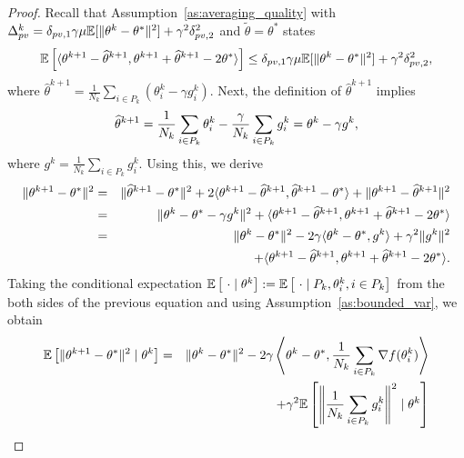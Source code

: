 \begin{proof}
Recall that Assumption~\ref{as:averaging_quality} with $\Delta_{pv}^k = \delta_{pv,1}\gamma\mu\mathbb{E}[\|\theta^k-\theta^*\|^2] + \gamma^2\delta_{pv,2}^2$ and $\widetilde{\theta} = \theta^*$ states
\begin{equation}
    \mathbb{E}\left[\langle\theta^{k+1} - \widehat{\theta}^{k+1}, \theta^{k+1}+\widehat{\theta}^{k+1} - 2\theta^*\rangle\right] \le \delta_{pv,1}\gamma\mu\mathbb{E}[\|\theta^k-\theta^*\|^2] + \gamma^2\delta_{pv,2}^2, \label{eq:key_lemma_cvx_tech_1}
\end{equation}
where $\widehat \theta^{k+1} = \frac{1}{N_{k}}\sum_{i\in P_{k}}(\theta_i^{k}-\gamma g_i^k)$. Next, the definition of $\widehat \theta^{k+1}$ implies
\begin{equation}
    \widehat \theta^{k+1} = \frac{1}{N_k}\sum\limits_{i\in P_{k}}\theta_i^{k} - \frac{\gamma}{N_k}\sum\limits_{i\in P_{k}} g_i^k = \theta^k - \gamma g^k,\notag
\end{equation}
where $g^k = \frac{1}{N_k}\sum_{i\in P_k}g_i^k$. Using this, we derive
\begin{eqnarray}
    \|\theta^{k+1} - \theta^*\|^2 &=& \|\widehat{\theta}^{k+1} - \theta^*\|^2 + 2\langle \theta^{k+1} - \widehat{\theta}^{k+1}, \widehat{\theta}^{k+1} - \theta^* \rangle + \|\theta^{k+1} - \widehat{\theta}^{k+1}\|^2\notag\\
    &=& \|\theta^k - \theta^* - \gamma g^k\|^2 +  \langle\theta^{k+1} - \widehat{\theta}^{k+1}, \theta^{k+1}+\widehat{\theta}^{k+1} - 2\theta^*\rangle \notag\\
    &=& \|\theta^k - \theta^*\|^2 -2\gamma\langle\theta^k - \theta^*, g^k\rangle + \gamma^2\|g^k\|^2\notag\\
    &&\quad +  \langle\theta^{k+1} - \widehat{\theta}^{k+1}, \theta^{k+1}+\widehat{\theta}^{k+1} - 2\theta^*\rangle. \notag
\end{eqnarray}
Taking the conditional expectation $\EE\left[\ \cdot \mid \theta^k\right] := \EE\left[\ \cdot \mid P_k, \theta_i^k, i\in P_k\right]$ from the both sides of the previous equation and using Assumption~\ref{as:bounded_var}, we obtain
\begin{eqnarray}
    \EE\left[\|\theta^{k+1} - \theta^*\|^2\mid \theta^k\right] &=& \|\theta^k - \theta^*\|^2 -2\gamma\left\langle\theta^k - \theta^*, \frac{1}{N_k}\sum\limits_{i\in P_k}\nabla f(\theta_i^k)\right\rangle\notag\\
    &&\quad + \gamma^2\EE\left[\left\|\frac{1}{N_k}\sum\limits_{i\in P_k}g_i^k\right\|^2\mid \theta^k\right] \notag\\

\end{eqnarray}
\end{proof}
